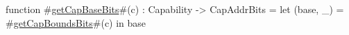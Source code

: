 function #\hyperref[sailRISCVzgetCapBaseBits]{getCapBaseBits}#(c) : Capability -> CapAddrBits =
    let (base, _) = #\hyperref[sailRISCVzgetCapBoundsBits]{getCapBoundsBits}#(c) in
    base
